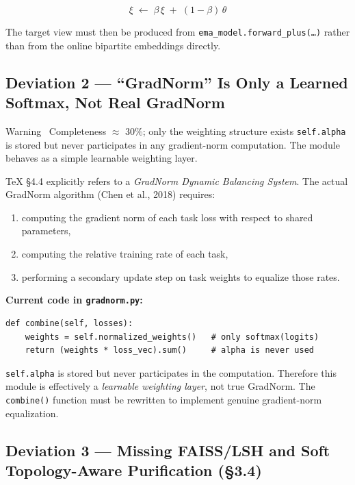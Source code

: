 \documentclass[11pt,a4paper]{article}
\begin{document}
\[
  \xi \;\leftarrow\; \beta\,\xi \;+\; (1-\beta)\,\theta
\]

The target view must then be produced from \texttt{ema\_model.forward\_plus(\ldots)} rather than from the online bipartite embeddings directly.

\subsection{Deviation 2 --- ``GradNorm'' Is Only a Learned Softmax, Not Real GradNorm}

\begin{warnbox}{Warning \textemdash\ Completeness $\approx$ 30\%; only the weighting structure exists}
\texttt{self.alpha} is stored but never participates in any gradient-norm computation.
The module behaves as a simple learnable weighting layer.
\end{warnbox}

\TeX{} \S4.4 explicitly refers to a \emph{GradNorm Dynamic Balancing System}.
The actual GradNorm algorithm (Chen et al., 2018) requires:
\begin{enumerate}[leftmargin=1.5em, itemsep=2pt]
\item computing the gradient norm of each task loss with respect to shared parameters,
\item computing the relative training rate of each task,
\item performing a secondary update step on task weights to equalize those rates.
\end{enumerate}

\textbf{Current code in \texttt{gradnorm.py}:}

\begin{lstlisting}[style=mypython, caption={Current \texttt{combine()} \textendash{} only softmax weighting, no gradient norms}]
def combine(self, losses):
    weights = self.normalized_weights()   # only softmax(logits)
    return (weights * loss_vec).sum()     # alpha is never used
\end{lstlisting}

\texttt{self.alpha} is stored but never participates in the computation.
Therefore this module is effectively a \emph{learnable weighting layer}, not true GradNorm.
The \texttt{combine()} function must be rewritten to implement genuine gradient-norm equalization.

\subsection{Deviation 3 --- Missing FAISS/LSH and Soft Topology-Aware Purification (\S3.4)}
\end{document}
